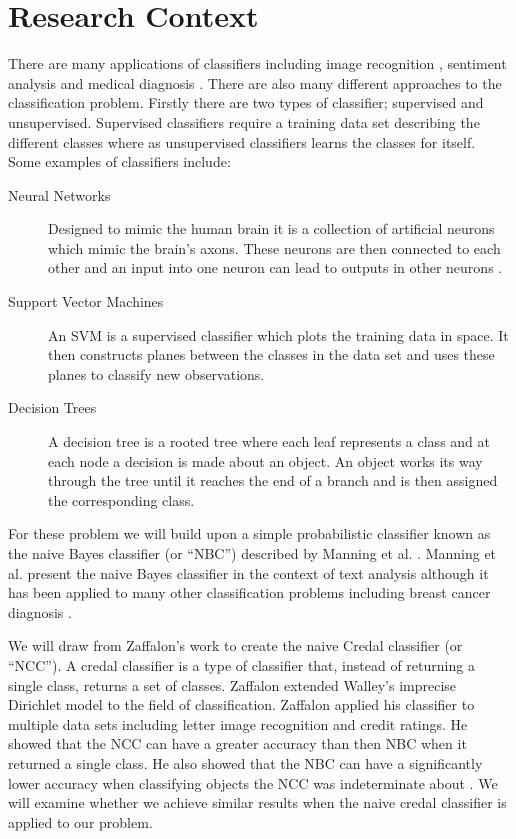 \section{Research Context}
There are many applications of classifiers including image recognition \cite{Chapelle99}, sentiment analysis \cite{Melville09} and medical diagnosis \cite{vster96}.
There are also many different approaches to the classification problem.
Firstly there are two types of classifier; supervised and unsupervised.
Supervised classifiers require a training data set describing the different classes where as unsupervised classifiers learns the classes for itself.
Some examples of classifiers include:
\begin{description}
	\item[Neural Networks] Designed to mimic the human brain it is a collection of artificial neurons which mimic the brain's axons. These neurons are then connected to each other and an input into one neuron can lead to outputs in other neurons \cite{Michie94}.
	\item[Support Vector Machines] An SVM is a supervised classifier which plots the training data in space. It then constructs planes between the classes in the data set and uses these planes to classify new observations.
	\item[Decision Trees] A decision tree is a rooted tree where each leaf represents a class and at each node a decision is made about an object. An object works its way through the tree until it reaches the end of a branch and is then assigned the corresponding class. 
\end{description}

For these problem we will build upon a simple probabilistic classifier known as the naive Bayes classifier (or ``NBC'') described by Manning et al. \cite{Manning08}.
Manning et al. present the naive Bayes classifier in the context of text analysis although it has been applied to many other classification problems including breast cancer diagnosis \cite{Dumitru09}.

We will draw from Zaffalon's work \cite{Zaffalon01} to create the naive Credal classifier (or ``NCC'').
A credal classifier is a type of classifier that, instead of returning a single class, returns a set of classes.
Zaffalon extended Walley's imprecise Dirichlet model \cite{Walley96} to the field of classification.
Zaffalon applied his classifier to multiple data sets including letter image recognition and credit ratings.
He showed that the NCC can have a greater accuracy than then NBC when it returned a single class.
He also showed that the NBC can have a significantly lower accuracy when classifying objects the NCC was indeterminate about \cite{Zaffalon01}.
We will examine whether we achieve similar results when the naive credal classifier is applied to our problem.

